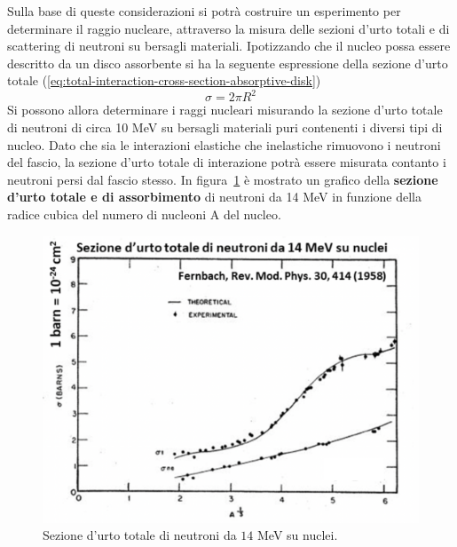 Sulla base di queste considerazioni si potrà costruire un esperimento
per determinare il raggio nucleare, attraverso la misura delle sezioni
d'urto totali e di scattering di neutroni su bersagli materiali.
Ipotizzando che il nucleo possa essere descritto da un disco assorbente
si ha la seguente espressione della sezione d'urto totale (\ref{eq:total-interaction-cross-section-absorptive-disk})
\[
	\sigma = 2 \pi R^2
\]
Si possono allora determinare i raggi nucleari misurando la sezione
d'urto totale di neutroni di circa 10 MeV su bersagli materiali puri
contenenti i diversi tipi di nucleo.
Dato che sia le interazioni elastiche che inelastiche rimuovono i neutroni del fascio, la sezione d'urto totale di
interazione potrà essere misurata contanto i neutroni persi dal fascio stesso.
In figura~\ref{fig:cross-section-neutroni} è mostrato un grafico della \textbf{sezione d'urto totale e
di assorbimento} di neutroni da 14 MeV in funzione della radice cubica
del numero di nucleoni A del nucleo.
\begin{figure}
	\centering
	\includegraphics{figs/grafico-cross-sect-neutroni}
	\caption{Sezione d'urto totale di neutroni da $14$ MeV su nuclei.}
	\label{fig:cross-section-neutroni}
\end{figure}

